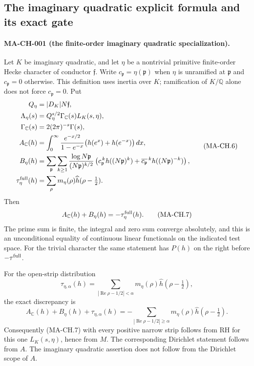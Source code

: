 \subsection{The imaginary quadratic explicit formula and its exact gate}

\paragraph{MA-CH-001 (the finite-order imaginary quadratic specialization).}
Let $K$ be imaginary quadratic, and let $\eta$ be a nontrivial
primitive finite-order Hecke character of conductor $\mathfrak f$.
Write $c_{\mathfrak p}=\eta(\mathfrak p)$ when $\eta$ is
unramified at $\mathfrak p$ and $c_{\mathfrak p}=0$ otherwise.
This definition uses inertia over $K$; ramification of $K/\mathbb Q$
alone does not force $c_{\mathfrak p}=0$.
Put
\[
 \begin{aligned}
 Q_\eta&=|D_K|N\mathfrak f,\\
 \Lambda_\eta(s)&=Q_\eta^{s/2}\Gamma_{\mathbb C}(s)L_K(s,\eta),\\
 \Gamma_{\mathbb C}(s)&=2(2\pi)^{-s}\Gamma(s),\\
 A_{\mathbb C}(h)&=\int_0^\infty
       \frac{e^{-x/2}}{1-e^{-x}}
          \bigl(h(e^x)+h(e^{-x})\bigr)\,dx,\\
 B_\eta(h)&=\sum_{\mathfrak p}\sum_{k\ge1}
       \frac{\log N\mathfrak p}{(N\mathfrak p)^{k/2}}
       \left(c_{\mathfrak p}^{\,k}h((N\mathfrak p)^k)
          +\overline{c_{\mathfrak p}}^{\,k}
                       h((N\mathfrak p)^{-k})\right),\\
 \tau_\eta^{\rm full}(h)&=\sum_\rho
           m_\eta(\rho)\widehat h(\rho-\tfrac12).
 \end{aligned}
 \tag{MA-CH.6}
\]
Then
\[
              A_{\mathbb C}(h)+B_\eta(h)
                         =-\tau_\eta^{\rm full}(h).
 \tag{MA-CH.7}
\]
The prime sum is finite, the integral and zero sum converge
absolutely, and this is an unconditional equality of continuous
linear functionals on the indicated test space.  For the trivial
character the same statement has $P(h)$ on the right before
$-\tau^{\rm full}$.

For the open-strip distribution
\[
 \tau_{\eta,\alpha}(h)=
     \sum_{|\operatorname{Re}\rho-1/2|<\alpha}
            m_\eta(\rho)\widehat h(\rho-\tfrac12),
 \tag{MA-CH.8}
\]
the exact discrepancy is
\[
 A_{\mathbb C}(h)+B_\eta(h)+\tau_{\eta,\alpha}(h)
       =-\!\sum_{|\operatorname{Re}\rho-1/2|\ge\alpha}
            m_\eta(\rho)\widehat h(\rho-\tfrac12).
 \tag{MA-CH.9}
\]
Consequently (MA-CH.7) with every positive narrow strip follows
from RH for this one $L_K(s,\eta)$, hence from $M$.  The
corresponding Dirichlet statement follows from $A$.  The
imaginary quadratic assertion does not follow from the
Dirichlet scope of $A$.

